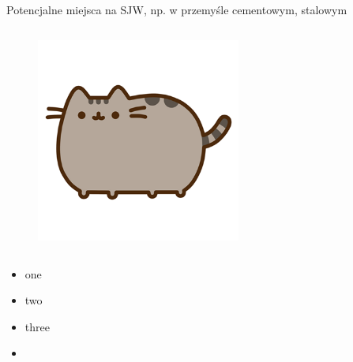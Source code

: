\begin{columnframe}{Potencjalne miejsca na SJW, np. w przemyśle cementowym, stalowym}
    \begin{column}{0.5\textwidth}
        \begin{figure}
            \centering
            \includegraphics[width=0.6\textwidth, frame]{images/pusheen.png}
        \end{figure}
    \end{column}
    \begin{column}{0.5\textwidth}
        \begin{itemize}
            \item one \keV
            \item two \MeV
            \item three \GeV
            \item \aegis
        \end{itemize}
    \end{column}
\end{columnframe}

